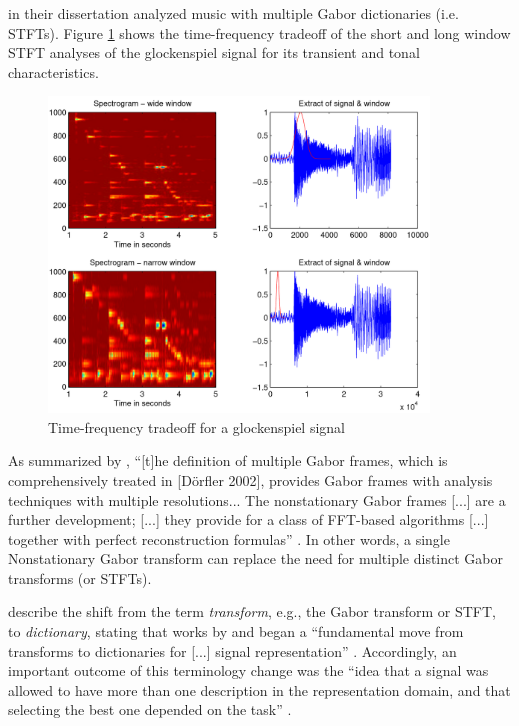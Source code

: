 \documentclass[report.tex]{subfiles}
\begin{document}
\textcite{doerflerphd} in their dissertation analyzed music with multiple Gabor dictionaries (i.e. STFTs). Figure \ref{fig:dorflertradeoff} shows the time-frequency tradeoff of the short and long window STFT analyses of the glockenspiel signal for its transient and tonal characteristics.

\begin{figure}[ht]
	\centering
	\includegraphics[width=0.9\textwidth]{./images-tftheory/tf_tradeoff_dorfler.png}
	\caption{Time-frequency tradeoff for a glockenspiel signal \parencite[20]{doerflerphd}}
	\label{fig:dorflertradeoff}
\end{figure}

As summarized by \citeauthor{adaptivecqt}, ``[t]he definition of multiple Gabor frames, which is comprehensively treated in [D{\"o}rfler 2002], provides Gabor frames with analysis techniques with multiple resolutions... The nonstationary Gabor frames [...] are a further development; [...] they provide for a class of FFT-based algorithms [...] together with perfect reconstruction formulas'' \parencite[2]{adaptivecqt}. In other words, a single Nonstationary Gabor transform can replace the need for multiple distinct Gabor transforms (or STFTs).

\citeauthor{dictionary} describe the shift from the term \textit{transform}, e.g., the Gabor transform or STFT, to \textit{dictionary}, stating that works by \cite{dictionary1} and \cite{dictionary2} began a ``fundamental move from transforms to dictionaries for [...] signal representation'' \parencite[1,049]{dictionary}. Accordingly, an important outcome of this terminology change was the ``idea that a signal was allowed to have more than one description in the representation domain, and that selecting the best one depended on the task'' \parencite[1,049]{dictionary}.
\end{document}
